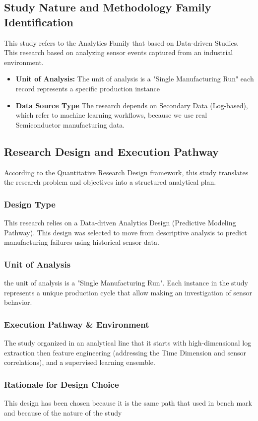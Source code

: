 \documentclass[12pt,oneside]{article}
\begin{document}
\subsection{Study Nature and Methodology Family Identification}
This study refers to the Analytics Family that based on Data-driven Studies. This research based on analyzing sensor events captured from an industrial environment.
\begin{itemize}[]
    \item \textbf{{\textcolor{DeepMaroon} {Unit of Analysis:}}} The unit of analysis is a "Single Manufacturing Run" each record represents a specific production instance
     \item \textbf{{\textcolor{DeepMaroon} {Data Source Type}}} The research depends on Secondary Data (Log-based), which refer to machine learning workflows, because we use real Semiconductor manufacturing data.
\end{itemize}

\subsection{Research Design and Execution Pathway}
According to the Quantitative Research Design framework, this study translates the research problem and objectives into a structured analytical plan.
\subsubsection{Design Type}
This research relies on a Data-driven Analytics Design (Predictive Modeling Pathway). This design was selected to move from descriptive analysis to predict manufacturing failures using historical sensor data.
\subsubsection{Unit of Analysis}
the unit of analysis is a "Single Manufacturing Run". Each instance in the study represents a unique production cycle that allow making an investigation of sensor behavior.
\subsubsection{Execution Pathway \& Environment}
The study organized in an analytical line that it starts with high-dimensional log extraction then feature engineering (addressing the Time Dimension and sensor correlations), and a supervised learning ensemble.
\subsubsection{Rationale for Design Choice}
This design has been chosen because it is the same path that used in bench mark and because of the nature of the study
\end{document}
